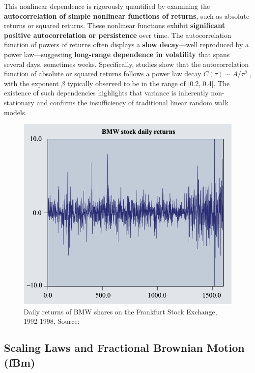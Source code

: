 \documentclass{ieeetj}
\begin{document}
This nonlinear dependence is rigorously quantified by examining the \textbf{autocorrelation of simple nonlinear functions of returns}, such as absolute returns or squared returns\cite{cont2001}. These nonlinear functions exhibit\textbf{ significant positive autocorrelation or persistence} over time. The autocorrelation function of powers of returns often displays a \textbf{slow decay}—well reproduced by a power law—suggesting \textbf{long-range dependence in volatility} that spans several days, sometimes weeks. Specifically, studies show that the autocorrelation function of absolute or squared returns follows a power law decay $C(\tau)\sim A/\tau^{\beta}$
 , with the exponent $\beta$ typically observed to be in the range of [0.2, 0.4]. The existence of such dependencies highlights that variance is inherently non-stationary and confirms the insufficiency of traditional linear random walk models.

 \begin{figure}
     \centering
     \includegraphics[width=1\linewidth]{daily_returns_of_bmw.png}
     \caption{Daily returns of BMW shares on the Frankfurt Stock Exchange, 1992-1998, Source: \cite{cont2001}}
     \label{fig:placeholder}
 \end{figure}

\subsection{Scaling Laws and Fractional Brownian Motion (fBm)}
\end{document}
